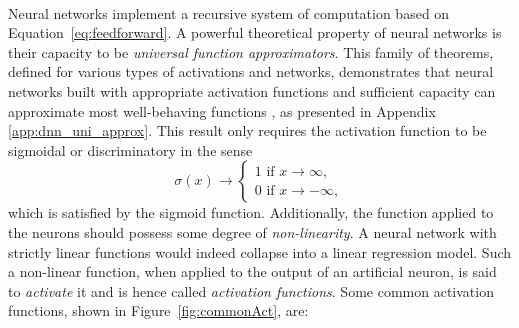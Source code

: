 \paragraph{}Neural networks implement a recursive system of computation based on Equation~\ref{eq:feedforward}. A powerful theoretical property of neural networks is their capacity to be \textit{universal function approximators}. This family of theorems, defined for various types of activations and networks, demonstrates that neural networks built with appropriate activation functions and sufficient capacity can approximate most well-behaving functions \cite{universalFuncApproxNN,HORNIK1989359, universApproximator-Relu}, as presented in Appendix \ref{app:dnn_uni_approx}. This result only requires the activation function to be sigmoidal or discriminatory in the sense
\begin{equation}
    \sigma(x) \rightarrow
    \begin{cases}
        1 \text{ if } x \rightarrow \infty,  \\
        0 \text{ if } x \rightarrow -\infty,
    \end{cases}
\end{equation}
which is satisfied by the sigmoid function. Additionally, the function applied to the neurons should possess some degree of \textit{non-linearity}. A neural network with strictly linear functions would indeed collapse into a linear regression model. Such a non-linear function, when applied to the output of an artificial neuron, is said to \textit{activate} it and is hence called \textit{activation functions}. Some common activation functions, shown in Figure~\ref{fig:commonAct}, are:

